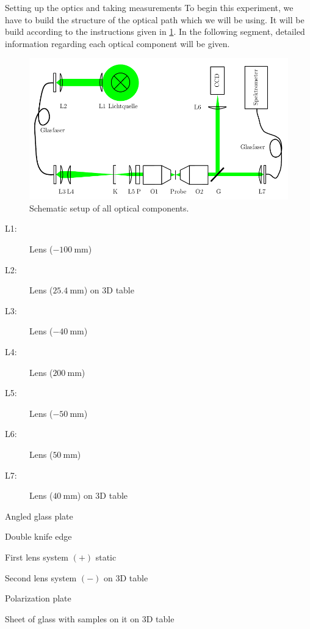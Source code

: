 \documentclass[pdftex, a4paper,11pt, twoside, UKenglish]{report}
\begin{document}
  \begin{chapter}{Setting up the optics and taking measurements}
    \label{chp:Setup}
    To begin this experiment, we have to build the structure of the optical
    path which we will be using. It will be build according to the instructions
    given in \cref{fig:Setup}. In the following segment, detailed information
    regarding each optical component will be given.
    \begin{figure}[hb]
      \centering
      \includegraphics[width=\textwidth]{Figures/Setup.png}
      \caption{Schematic setup of all optical components.\cite{bib:Anleitung}}
      \label{fig:Setup}
    \end{figure}
    
    \begin{minipage}{0.41\textwidth}
      \begin{description}
        \item[L1:] Lens ($\SI{-100}{\milli\meter}$)
        \item[L2:] Lens ($\SI{+25.4}{\milli\meter}$) on 3D table
        \item[L3:] Lens ($\SI{-40}{\milli\meter}$)
        \item[L4:] Lens ($\SI{+200}{\milli\meter}$)
        \item[L5:] Lens ($\SI{-50}{\milli\meter}$)
        \item[L6:] Lens ($\SI{+50}{\milli\meter}$)
        \item[L7:] Lens ($\SI{+40}{\milli\meter}$) on 3D table
      \end{description}
    \end{minipage}\quad
    \begin{minipage}{0.55\textwidth}
      \begin{description}
        \item[G:] Angled glass plate
        \item[K:] Double knife edge
        \item[O1:] First lens system $(+)$ static
        \item[O2:] Second lens system $(-)$ on 3D table
        \item[P:] Polarization plate
        \item[Probe:] Sheet of glass with samples on it on 3D table
        \item
      \end{description}
    \end{minipage}
    

\end{chapter}
\end{document}
